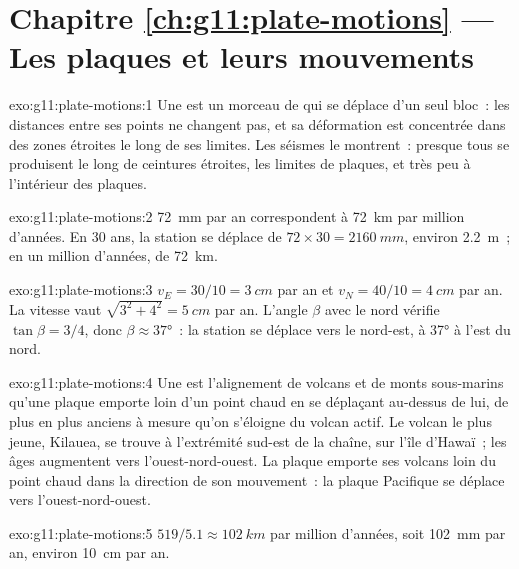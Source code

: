 \section*{Chapitre \ref{ch:g11:plate-motions} --- Les plaques et leurs mouvements}

\begin{solution}{exo:g11:plate-motions:1}
Une  est un morceau de  qui se déplace d'un seul
bloc~: les distances entre ses points ne changent pas, et sa déformation est
concentrée dans des zones étroites le long de ses limites. Les séismes le
montrent~: presque tous se produisent le long de ceintures étroites, les
limites de plaques, et très peu à l'intérieur des plaques.
\end{solution}

\begin{solution}{exo:g11:plate-motions:2}
\qty{72}{mm} par an correspondent à \qty{72}{km} par million d'années. En
30 ans, la station se déplace de $72 \times 30 = \qty{2160}{mm}$, environ
\qty{2.2}{m}~; en un million d'années, de \qty{72}{km}.
\end{solution}

\begin{solution}{exo:g11:plate-motions:3}
$v_E = 30/10 = \qty{3}{cm}$ par an et $v_N = 40/10 = \qty{4}{cm}$ par an. La
vitesse vaut $\sqrt{3^2 + 4^2} = \qty{5}{cm}$ par an. L'angle $\beta$ avec
le nord vérifie $\tan\beta = 3/4$, donc $\beta \approx \ang{37}$~: la
station se déplace vers le nord-est, à \ang{37} à l'est du nord.
\end{solution}

\begin{solution}{exo:g11:plate-motions:4}
Une  est l'alignement de volcans et de monts sous-marins
qu'une plaque emporte loin d'un point chaud en se déplaçant au-dessus de
lui, de plus en plus anciens à mesure qu'on s'éloigne du volcan actif. Le
volcan le plus jeune, Kilauea, se trouve à l'extrémité sud-est de la chaîne,
sur l'île d'Hawaï~; les âges augmentent vers l'ouest-nord-ouest. La plaque
emporte ses volcans loin du point chaud dans la direction de son
mouvement~: la plaque Pacifique se déplace vers l'ouest-nord-ouest.
\end{solution}

\begin{solution}{exo:g11:plate-motions:5}
$519/5.1 \approx \qty{102}{km}$ par million d'années, soit \qty{102}{mm} par
an, environ \qty{10}{cm} par an.
\end{solution}

